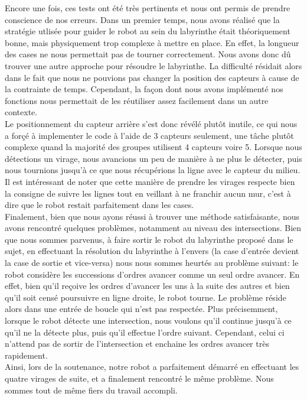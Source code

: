             Encore une fois, ces tests ont été très pertinents et nous ont permis de prendre conscience de nos erreurs. Dans un premier temps, nous avons réalisé que la stratégie utlisée pour guider le robot au sein du labyrinthe était théoriquement bonne, mais physiquement trop complexe à mettre en place. En effet, la longueur des cases ne nous permettait pas de tourner correctement. Nous avons donc dû trouver une autre approche pour résoudre le labyrinthe. La difficulté résidait alors dans le fait que nous ne pouvions pas changer la position des capteurs à cause de la contrainte de temps. Cependant, la façon dont nous avons implémenté nos fonctions nous permettait de les réutiliser assez facilement dans un autre contexte.\\

            Le positionnement du capteur arrière s'est donc révélé plutôt inutile, ce qui nous a forçé à implementer le code à l'aide de 3 capteurs seulement, une tâche plutôt complexe quand la majorité des groupes utilisent 4 capteurs voire 5. Lorsque nous détections un virage, nous avancions un peu de manière à ne plus le détecter, puis nous tournions jusqu'à ce que nous récupérions la ligne avec le capteur du milieu. Il est intéressant de noter que cette manière de prendre les virages respecte bien la consigne de suivre les lignes tout en veillant à ne franchir aucun mur, c'est à dire que le robot restait parfaitement dans les cases.\\

            Finalement, bien que nous ayons réussi à trouver une méthode satisfaisante, nous avons rencontré quelques problèmes, notamment au niveau des intersections. Bien que nous sommes parvenus, à faire sortir le robot du labyrinthe proposé dans le sujet, en effectuant la résolution du labyrinthe à l'envers (la case d'entrée devient la case de sortie et vice-versa) nous nous sommes heurtés au problème suivant: le robot considère les successions d'ordres avancer comme un seul ordre avancer. En effet, bien qu'il reçoive les ordres d'avancer les uns à la suite des autres et bien qu'il soit censé poursuivre en ligne droite, le robot tourne. Le problème réside alors dans une entrée de boucle qui n'est pas respectée. Plus précisemment, lorsque le robot détecte une intersection, nous voulons qu'il continue jusqu'à ce qu'il ne la détecte plus, puis qu'il effectue l'ordre suivant. Cependant, celui ci n'attend pas de sortir de l'intersection et enchaine les ordres avancer très rapidement.\\ 

            Ainsi, lors de la soutenance, notre robot a parfaitement démarré en effectuant les quatre virages de suite, et a finalement rencontré le même problème. Nous sommes tout de même fiers du travail accompli.

